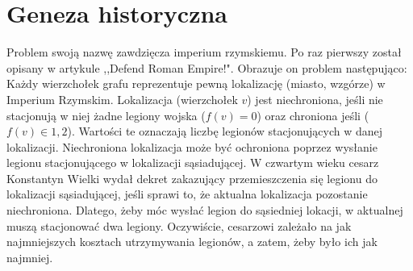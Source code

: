 \section{Geneza historyczna}
Problem swoją nazwę zawdzięcza imperium rzymskiemu. Po raz pierwszy został opisany w artykule ,,Defend Roman Empire!".\cite{defendRomanEmpire}
Obrazuje on problem następująco: Każdy wierzchołek grafu reprezentuje pewną lokalizację (miasto, wzgórze) w Imperium Rzymskim. Lokalizacja (wierzchołek $v$) jest niechroniona, jeśli nie stacjonują w niej żadne legiony wojska ($f(v) = 0$) oraz chroniona jeśli ($f(v) \in {1,2} $). Wartości te oznaczają liczbę legionów stacjonujących w danej lokalizacji. Niechroniona lokalizacja może być ochroniona poprzez wysłanie legionu stacjonującego w lokalizacji sąsiadującej. W czwartym wieku cesarz Konstantyn Wielki wydał dekret zakazujący przemieszczenia się legionu do lokalizacji sąsiadującej, jeśli sprawi to, że aktualna lokalizacja pozostanie niechroniona. Dlatego, żeby móc wysłać legion do sąsiedniej lokacji, w aktualnej muszą stacjonować dwa legiony. Oczywiście, cesarzowi zależało na jak najmniejszych kosztach utrzymywania legionów, a zatem, żeby było ich jak najmniej. \cite{theoryWCRDF}

